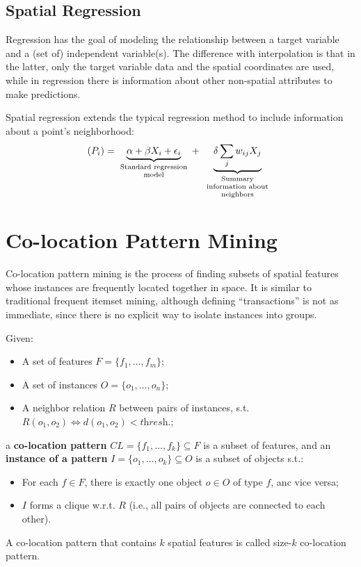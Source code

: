 \subsection{Spatial Regression}

Regression has the goal of modeling the relationship between a target variable and a (set of) independent variable(s). The difference with interpolation is that in the latter, only the target variable data and the spatial coordinates are used, while in regression there is information about other non-spatial attributes to make predictions.

Spatial regression extends the typical regression method to include information about a point's neighborhood:
\begin{equation*}
    (P_i) = \underbrace{\alpha + \beta X_i + \epsilon_i}_{\parbox{7.5em}{\scriptsize\centering Standard regression model}} + \underbrace{\delta \sum_j w_{ij} X_j}_{\parbox{7.5em}{\scriptsize\centering Summary information about neighbors}}
\end{equation*}

\section{Co-location Pattern Mining}

Co-location pattern mining is the process of finding subsets of spatial features whose instances are frequently located together in space. It is similar to traditional frequent itemset mining, although defining ``transactions'' is not as immediate, since there is no explicit way to isolate instances into groups.

Given:
\begin{itemize}
    \item A set of features $F = \{f_1, \dots, f_m\}$;
    \item A set of instances $O = \{o_1, \dots, o_n\}$;
    \item A neighbor relation $R$ between pairs of instances, s.t. $R(o_1, o_2) \iff d(o_1, o_2) < \textit{thresh.}$; 
\end{itemize}
a \textbf{co-location pattern} $CL = \{f_1, \dots, f_k\} \subseteq F$ is a subset of features, and an \textbf{instance of a pattern} $I = \{o_1, \dots, o_k\} \subseteq O$ is a subset of objects s.t.:
\begin{itemize}
    \item For each $f \in F$, there is exactly one object $o \in O$ of type $f$, anc vice versa;
    \item $I$ forms a clique w.r.t. $R$ (i.e., all pairs of objects are connected to each other).
\end{itemize}
A co-location pattern that contains $k$ spatial features is called size-$k$ co-location pattern.

